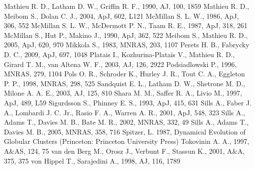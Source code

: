 \begin{thebibliography}{99}
  Mathieu R. D., Latham D. W., Griffin R. F., 1990, AJ, 100, 1859
  Mathieu R. D., Meibom S., Dolan C. J., 2004, ApJ, 602, L121
  McMillan S. L. W., 1986, ApJ, 306, 552 
  McMillan S. L. W., McDermott P. N., Taam R. E., 1987, ApJ, 318,
  261
  McMillan S., Hut P., Makino J., 1990, ApJ, 362, 522
  Meibom S., Mathieu R. D., 2005, ApJ, 620, 970
 Mikkola
  S., 1983, MNRAS, 203, 1107 
 Perets
  H. B., Fabrycky D. C., 2009, ApJ, 697, 1048 
 Platais I.,
  Kozhurina-Platais V., Mathieu R. D., Girard T. M., van Altena
  W. F., 2003, AJ, 126, 2922
  Podsiadlowski P., 1996, MNRAS, 279, 1104
 Pols
  O. R., Schroder K., Hurley J. R., Tout C. A., Eggleton
  P. P., 1998, MNRAS, 298, 525 
  Sandquist E. L., Latham D. W., Shetrone M. D., Milone
  A. A. E., 2003, AJ, 125, 810
 Shara
  M. M., Saffer R. A., Livio M., 1997, ApJ, 489, L59
 Sigurdsson S., Phinney
  E. S., 1993, ApJ, 415, 631 
  Sills
  A., Faber J. A., Lombardi J. C. Jr., Rasio F. A., Warren A. R.,
  2001, ApJ, 548, 323 
  Sills
  A., Adams T., Davies M. B., Bate M. R., 2002, MNRAS, 332, 49
  Sills
  A., Adams T., Davies M. B., 2005, MNRAS, 358, 716
 Spitzer,
  L. 1987, Dynamical Evolution of Globular Clusters (Princeton:
  Princeton University Press)
  Tokovinin A. A., 1997, A\&AS, 124, 75
 van den Berg M., Orosz J., Verbunt
  F., Stassun K., 2001, A\&A, 375, 375 
 von Hippel T., Sarajedini
  A., 1998, AJ, 116, 1789 

\end{thebibliography}



%